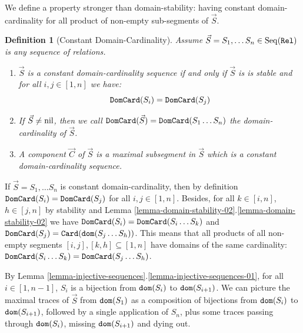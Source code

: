 \documentclass{lmcs}
\newtheorem{definition}[theorem]{Definition}
\begin{document}
We define a property stronger than domain-stability: having constant domain-cardinality
for all product of non-empty sub-segments of $\vec{S}$.


\begin{definition}[Constant Domain-Cardinality]
Assume $\vec{S}=S_1, \ldots S_n \in {\rm Seq}({\tt Rel})$ is any sequence of relations.
\begin{enumerate}

\item
$\vec{S}$ is a constant domain-cardinality sequence if and only if $\vec{S}$ is is stable
and for all $i,j \in [1,n]$ we have:
$$
{\tt DomCard}(S_i) = {\tt DomCard}(S_j)
$$

\item
If $\vec{S} \not = {{\rm nil}}$, then we call ${\tt DomCard}(\vec{S}) = {\tt DomCard}(S_1 \ldots S_n)$ 
the domain-cardinality of $\vec{S}$.

\item
A \emph{component} $\vec{C}$ of $\vec{S}$ is a maximal subsegment 
in $\vec{S}$ which is a constant domain-cardinality sequence.
\end{enumerate}
\end{definition}

If $\vec{S}=S_1, \ldots S_n$ is constant domain-cardinality, then by definition
${\tt DomCard}(S_i) = {\tt DomCard}(S_j)$ for all $i,j \in [1,n]$. 
Besides, for all $k \in [i,n]$, $h \in [j,n]$ 
by stability and Lemma \ref{lemma-domain-stability-02}.\ref{lemma-domain-stability-02} 
we have ${\tt DomCard}(S_i) ={\tt DomCard}(S_i \ldots S_k)$ and
${\tt DomCard}(S_j) = {\tt Card}({\tt dom}(S_j \ldots S_h))$. This means that all products of
all non-empty segments $[i,j],[k,h] \subseteq [1,n]$ have domains of the same cardinality: 
${\tt DomCard}(S_i \ldots S_k) = {\tt DomCard}(S_j \ldots S_h)$.

By Lemma \ref{lemma-injective-sequences}.\ref{lemma-injective-sequences-01}, 
for all $i \in [1,n-1]$, $S_i$ is a bijection from ${\tt dom}(S_i)$ to
${\tt dom}(S_{i+1})$.  We can picture the maximal traces of $\vec{S}$ from ${\tt dom}(S_1)$ as a 
composition of bijections from ${\tt dom}(S_i)$ to ${\tt dom}(S_{i+1})$, followed by a single 
application of $S_n$, plus some traces passing through ${\tt dom}(S_i)$, missing ${\tt dom}(S_{i+1})$ 
and dying out.
\end{document}
